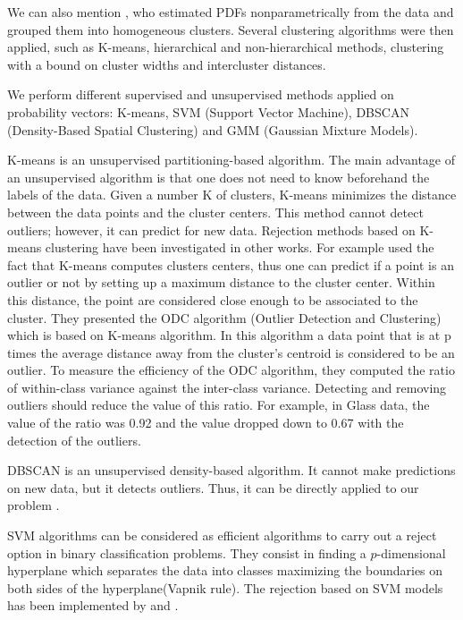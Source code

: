 \documentclass{siamart171218}
\begin{document}
We can also mention \cite{Clustering_probability_distributions}, who estimated PDFs nonparametrically from the data and grouped them into homogeneous clusters. Several clustering algorithms were then applied, such as K-means, hierarchical and non-hierarchical methods, clustering with a bound on  cluster widths and intercluster distances.

We perform different supervised and unsupervised methods applied on probability vectors: K-means, SVM (Support Vector Machine), DBSCAN (Density-Based Spatial Clustering) and GMM (Gaussian Mixture Models).

K-means is an unsupervised partitioning-based algorithm. The main advantage of an unsupervised algorithm is that one does not need to know beforehand the labels of the data. Given a number K of clusters, K-means minimizes the distance between the data points and the cluster centers. This method cannot detect outliers; however, it can predict for new data. Rejection methods based on K-means clustering have been investigated in other works. For example \cite{6566435} used the fact that K-means computes clusters centers, thus one can predict if a point is an outlier or not by setting up a maximum distance to the cluster center. Within this distance, the point are considered close enough to be associated to the cluster. They presented the ODC algorithm (Outlier Detection and Clustering) which is based on K-means algorithm. In this algorithm a data point that is at p times the average distance away from the cluster's centroid is considered to be an outlier. To measure the efficiency of the ODC algorithm, they computed the ratio of within-class variance against the inter-class variance. Detecting and removing outliers should reduce the value of this ratio. For example, in Glass data, the value of the ratio was 0.92 and the value dropped down to 0.67 with the detection of the outliers.

DBSCAN is an unsupervised density-based algorithm. It cannot make predictions on new data, but it detects outliers. Thus, it can be directly applied to our problem \cite{dbscan}.

SVM algorithms can be considered as efficient algorithms to carry out a reject option in binary classification problems. They consist in finding a $p$-dimensional hyperplane which separates the data into classes maximizing the boundaries on both sides of the hyperplane(Vapnik rule). The rejection based on SVM models has been implemented by \cite{djeffal_2012} and \cite{Grandvalet2008}. 
\end{document}

